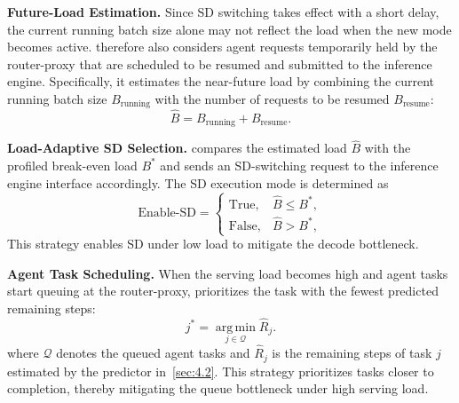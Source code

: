 \textbf{Future-Load Estimation.}
Since SD switching takes effect with a short delay, the current running batch size alone may not reflect the load when the new mode becomes active. 
\sysname therefore also considers agent requests temporarily held by the router-proxy that are scheduled to be resumed and submitted to the inference engine. 
Specifically, it estimates the near-future load by combining the current running batch size $B_{\mathrm{running}}$ with the number of requests to be resumed $B_{\mathrm{resume}}$:
\begin{equation}
\hat{B}=B_{\mathrm{running}}+B_{\mathrm{resume}}.
\end{equation}

\textbf{Load-Adaptive SD Selection.}
\sysname compares the estimated load $\hat{B}$ with the profiled break-even load $B^{*}$ and sends an SD-switching request to the inference engine interface accordingly. The SD execution mode is determined as
\begin{equation}
\mathrm{Enable\mbox{-}SD} =
\begin{cases}
\mathrm{True},  & \hat{B} \leq B^{*}, \\
\mathrm{False}, & \hat{B} > B^{*},
\end{cases}
\end{equation}
This strategy enables SD under low load to mitigate the decode bottleneck.

\textbf{Agent Task Scheduling.}
When the serving load becomes high and agent tasks start queuing at the router-proxy, \sysname prioritizes the task with the fewest predicted remaining steps:
\begin{equation}
j^{*} =
\operatorname*{arg\,min}_{j \in \mathcal{Q}}
\hat{R}_{j}.
\end{equation}
where $\mathcal{Q}$ denotes the queued agent tasks and $\hat{R}_{j}$ is the remaining steps of task $j$ estimated by the predictor in~\autoref{sec:4.2}.
This strategy prioritizes tasks closer to completion, thereby mitigating the queue bottleneck under high serving load.
